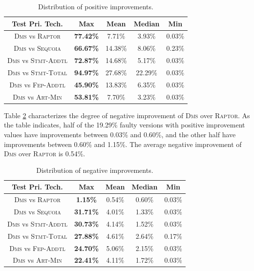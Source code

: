\begin{table}[!htbp]
    \centering
		\caption{Distribution of positive improvements.}
		\renewcommand{\arraystretch}{1.5}
		\small
        \begin{tabular}{|c|c|c|c|c|}
			\hline
			Test Pri. Tech.  &        Max &       Mean &     Median &        Min \\
			\hline\hline
			\textsc{Dms} vs \textsc{Raptor} & {\bf 77.42\%} &     7.71\% &     3.93\% &     0.03\% \\
			\hline
			\textsc{Dms} vs \textsc{Sequoia} & {\bf 66.67\%} &    14.38\% &     8.06\% &     0.23\% \\
			\hline
			\textsc{Dms} vs \textsc{Stmt-Addtl} & {\bf 72.87\%} &    14.68\% &     5.17\% &     0.03\% \\
			\hline
			\textsc{Dms} vs \textsc{Stmt-Total} & {\bf 94.97\%} &    27.68\% &    22.29\% &     0.03\% \\
			\hline
			\textsc{Dms} vs \textsc{Fep-Addtl} & {\bf 45.90\%} &    13.83\% &     6.35\% &     0.03\% \\
			\hline
			\textsc{Dms} vs \textsc{Art-Min} & {\bf 53.81\%} &     7.70\% &     3.23\% &     0.03\% \\
			\hline
		\end{tabular}
    \label{tab:compare_21}
\end{table}

Table \ref{tab:compare_31} characterizes the degree of negative improvement of
\textsc{Dms} over \textsc{Raptor}. As the table indicates, half of the 19.29\%
faulty versions with positive improvement values have improvements
between 0.03\% and 0.60\%, and the other half
have improvements between 0.60\% and 1.15\%. The average
negative improvement of \textsc{Dms} over \textsc{Raptor} is 0.54\%.

\begin{table}[!htbp]
    \centering
		\caption{Distribution of negative improvements.}
		\renewcommand{\arraystretch}{1.5}
		\small
        \begin{tabular}{|c|c|c|c|c|}
			\hline
			Test Pri. Tech.  &        Max &       Mean &     Median &        Min \\
			\hline\hline
			\textsc{Dms} vs \textsc{Raptor} & {\bf 1.15\%} &     0.54\% &     0.60\% &     0.03\% \\
			\hline
			\textsc{Dms} vs \textsc{Sequoia} & {\bf 31.71\%} &    4.01\% &     1.33\% &     0.03\% \\
			\hline
			\textsc{Dms} vs \textsc{Stmt-Addtl} & {\bf 30.73\%} &    4.14\% &     1.52\% &     0.03\% \\
			\hline
			\textsc{Dms} vs \textsc{Stmt-Total} & {\bf 27.88\%} &    4.61\% &    2.64\% &     0.17\% \\
			\hline
			\textsc{Dms} vs \textsc{Fep-Addtl} & {\bf 24.70\%} &    5.06\% &     2.15\% &     0.03\% \\
			\hline
			\textsc{Dms} vs \textsc{Art-Min} & {\bf 22.41\%} &     4.11\% &     1.72\% &     0.03\% \\
			\hline
		\end{tabular}
    \label{tab:compare_31}
\end{table}


